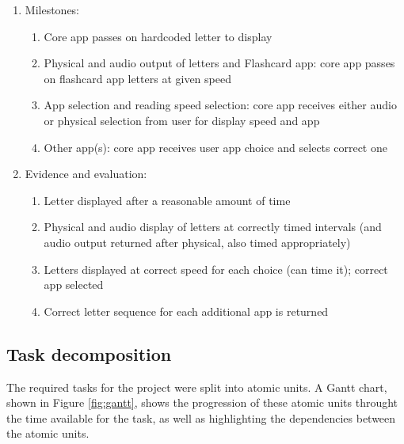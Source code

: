 \documentclass{article}
\begin{document}
\begin{enumerate}
  \item Milestones:
  \begin{enumerate}
    \item Core app passes on hardcoded letter to display
    \item Physical and audio output of letters and Flashcard app: core app passes on flashcard app letters at given speed
    \item App selection and reading speed selection: core app receives either audio or physical selection from user for display speed and app
    \item Other app(s): core app receives user app choice and selects correct one
  \end{enumerate}
  \item Evidence and evaluation:
  \begin{enumerate}
    \item Letter displayed after a reasonable amount of time
    \item Physical and audio display of letters at correctly timed intervals (and audio output returned after physical, also timed appropriately)
    \item Letters displayed at correct speed for each choice (can time it); correct app selected
    \item Correct letter sequence for each additional app is returned
  \end{enumerate}
\end{enumerate}


\subsection{Task decomposition}

The required tasks for the project were split into atomic units. A Gantt chart, shown in Figure \ref{fig:gantt}, shows the progression of these atomic units throught the time available for the task, as well as highlighting the dependencies between the atomic units.
\end{document}
